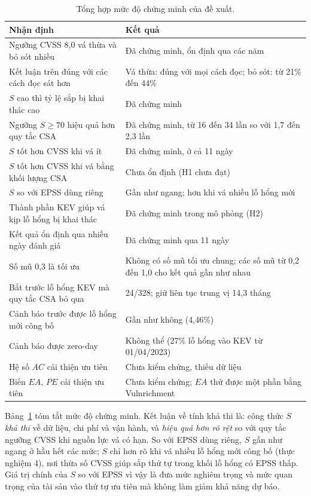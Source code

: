 \documentclass[runningheads]{llncs}
\begin{document}
\begin{table}
\centering
\caption{Tổng hợp mức độ chứng minh của đề xuất.}\label{tab:tonghop}
\begin{tabular}{p{6.6cm}p{4.6cm}}
\toprule
Nhận định & Kết quả \\
\midrule
Ngưỡng CVSS 8,0 vá thừa và bỏ sót nhiều & Đã chứng minh, ổn định qua các năm \\
Kết luận trên đúng với các cách đọc sát hơn & Vá thừa: đúng với mọi cách đọc; bỏ sót: từ 21\% đến 44\% \\
$S$ cao thì tỷ lệ sắp bị khai thác cao & Đã chứng minh \\
Ngưỡng $S \ge 70$ hiệu quả hơn quy tắc CSA & Đã chứng minh, từ 16 đến 34 lần so với 1,7 đến 2,3 lần \\
$S$ tốt hơn CVSS khi vá ít & Đã chứng minh, ở cả 11 ngày \\
$S$ tốt hơn CVSS khi vá bằng khối lượng CSA & Chưa ổn định (H1 chưa đạt) \\
$S$ so với EPSS dùng riêng & Gần như ngang; hơn khi vá nhiều lỗ hổng mới \\
Thành phần KEV giúp vá kịp lỗ hổng bị khai thác & Đã chứng minh trong mô phỏng (H2) \\
Kết quả ổn định qua nhiều ngày đánh giá & Đã chứng minh qua 11 ngày \\
Số mũ 0,3 là tối ưu & Không có số mũ tối ưu chung; các số mũ từ 0,2 đến 1,0 cho kết quả gần như nhau \\
Bắt trước lỗ hổng KEV mà quy tắc CSA bỏ qua & 24/328; giữ liên tục trung vị 14,3 tháng \\
Cảnh báo trước được lỗ hổng mới công bố & Gần như không (4,46\%) \\
Cảnh báo được zero-day & Không thể (27\% lỗ hổng vào KEV từ 01/04/2023) \\
Hệ số $AC$ cải thiện ưu tiên & Chưa kiểm chứng, thiếu dữ liệu \\
Biến $\mathit{EA}$, $\mathit{PE}$ cải thiện ưu tiên & Chưa kiểm chứng; $\mathit{EA}$ thử được một phần bằng Vulnrichment \\
\bottomrule
\end{tabular}
\end{table}

Bảng~\ref{tab:tonghop} tóm tắt mức độ chứng minh. Kết luận về tính khả thi là: công thức
$S$ \emph{khả thi} về dữ liệu, chi phí và vận hành, và \emph{hiệu quả hơn rõ rệt} so với quy tắc
ngưỡng CVSS khi nguồn lực vá có hạn. So với EPSS dùng riêng, $S$ gần như ngang ở hầu hết các
mức; $S$ chỉ hơn rõ khi vá nhiều lỗ hổng mới công bố (thực nghiệm 4), nơi thừa số CVSS giúp sắp thứ
tự trong khối lỗ hổng có EPSS thấp. Giá trị chính của $S$ so với EPSS vì vậy là đưa mức nghiêm trọng
và mức quan trọng của tài sản vào thứ tự ưu tiên mà không làm giảm khả năng dự báo.
\end{document}
